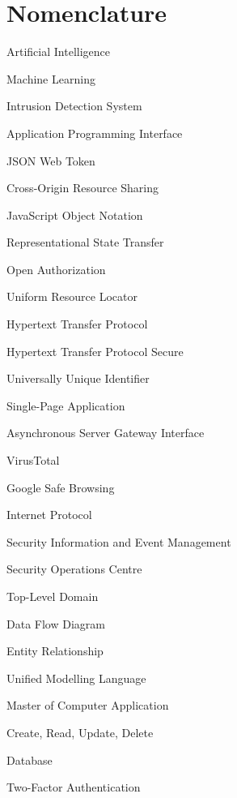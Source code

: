 \thispagestyle{empty}
\chapter*{Nomenclature}

\begin{description}

\item{}    Artificial Intelligence
\item{}    Machine Learning
\item{}   Intrusion Detection System
\item{}   Application Programming Interface
\item{}   JSON Web Token
\item{}  Cross-Origin Resource Sharing
\item{}  JavaScript Object Notation
\item{}  Representational State Transfer
\item{} Open Authorization
\item{}   Uniform Resource Locator
\item{}  Hypertext Transfer Protocol
\item{} Hypertext Transfer Protocol Secure
\item{}  Universally Unique Identifier
\item{}   Single-Page Application
\item{}  Asynchronous Server Gateway Interface
\item{}    VirusTotal
\item{}   Google Safe Browsing
\item{}    Internet Protocol
\item{}  Security Information and Event Management
\item{}   Security Operations Centre
\item{}   Top-Level Domain
\item{}   Data Flow Diagram
\item{}    Entity Relationship
\item{}   Unified Modelling Language
\item{}   Master of Computer Application
\item{}  Create, Read, Update, Delete
\item{}    Database
\item{}   Two-Factor Authentication

\end{description}
